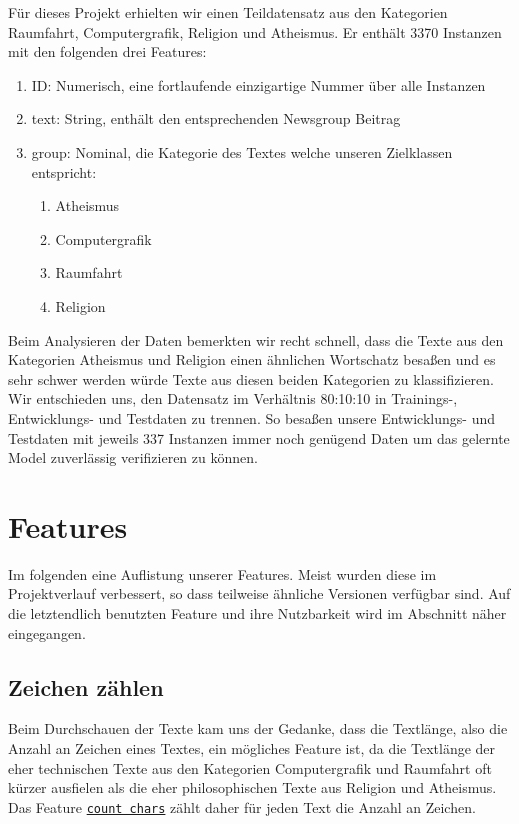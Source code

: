 \documentclass[
	11pt,
	a4paper
]{scrartcl}
\newcommand{\code}[1]{\texttt{\ul{#1}}}
\begin{document}
Für dieses Projekt erhielten wir einen Teildatensatz aus den Kategorien Raumfahrt,
Computergrafik, Religion und Atheismus. Er enthält 3370 Instanzen mit den folgenden drei Features:
\begin{enumerate}[label=\roman*), itemsep=0pt,parsep=0pt, topsep=0pt]
	\item ID: Numerisch, eine fortlaufende einzigartige Nummer über alle Instanzen
	\item text: String, enthält den entsprechenden Newsgroup Beitrag
	\item group: Nominal, die Kategorie des Textes welche unseren Zielklassen entspricht:
	\begin{enumerate}[label=\arabic*., itemsep=0pt,parsep=0pt, topsep=0pt, start=0]
		\item Atheismus
		\item Computergrafik
		\item Raumfahrt
		\item Religion
	\end{enumerate}
\end{enumerate}

Beim Analysieren der Daten bemerkten wir recht schnell, dass die Texte aus den Kategorien Atheismus und 
Religion einen ähnlichen Wortschatz besaßen und es sehr schwer werden würde Texte aus diesen beiden Kategorien zu 
klassifizieren.\\

Wir entschieden uns, den Datensatz im Verhältnis 80:10:10 in Trainings-, Entwicklungs- und Testdaten zu trennen. So besaßen
unsere Entwicklungs- und Testdaten mit jeweils 337 Instanzen immer noch genügend Daten um das gelernte Model zuverlässig 
verifizieren zu können.

\section{Features}
Im folgenden eine Auflistung unserer Features. Meist wurden diese im Projektverlauf verbessert, so dass teilweise ähnliche
Versionen verfügbar sind. Auf die letztendlich benutzten Feature und ihre Nutzbarkeit wird im Abschnitt \emph{}
näher eingegangen.

\subsection{Zeichen zählen}\label{zeichenzaehlen}
Beim Durchschauen der Texte kam uns der Gedanke, dass die Textlänge, also die Anzahl an Zeichen eines Textes, ein mögliches Feature
ist, da die Textlänge der eher technischen Texte aus den Kategorien Computergrafik und Raumfahrt oft kürzer ausfielen als die eher
philosophischen Texte aus Religion und Atheismus.\\
Das Feature \code{count chars} zählt daher für jeden Text die Anzahl an Zeichen.\\
\end{document}
